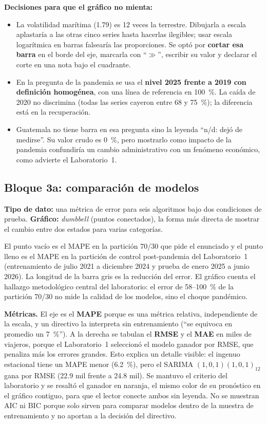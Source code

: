 \documentclass[12pt,letterpaper]{article}
\begin{document}
\textbf{Decisiones para que el gráfico no mienta:}
\begin{itemize}[leftmargin=1.4em,itemsep=2pt]
  \item La volatilidad marítima (1.79) es 12 veces la terrestre. Dibujarla a escala aplastaría a
  las otras cinco series hasta hacerlas ilegibles; usar escala logarítmica en barras
  falsearía las proporciones. Se optó por \textbf{cortar esa barra} en el borde del eje,
  marcarla con ``$\gg$'', escribir su valor y declarar el corte en una nota bajo el cuadrante.
  \item En la pregunta de la pandemia se usa el \textbf{nivel 2025 frente a 2019 con definición
  homogénea}, con una línea de referencia en 100~\%. La caída de 2020 no discrimina (todas las
  series cayeron entre 68 y 75~\%); la diferencia está en la recuperación.
  \item Guatemala no tiene barra en esa pregunta sino la leyenda ``n/d: dejó de medirse''. Su
  valor crudo es 0~\%, pero mostrarlo como impacto de la pandemia confundiría un cambio
  administrativo con un fenómeno económico, como advierte el Laboratorio~1.
\end{itemize}

\subsection{Bloque 3a: comparación de modelos}

\textbf{Tipo de dato:} una métrica de error para seis algoritmos bajo dos condiciones de prueba.
\textbf{Gráfico:} \textit{dumbbell} (puntos conectados), la forma más directa de mostrar el
cambio entre dos estados para varias categorías.

El punto vacío es el MAPE en la partición 70/30 que pide el enunciado y el punto lleno es el MAPE
en la partición de control post-pandemia del Laboratorio~1 (entrenamiento de julio 2021 a
diciembre 2024 y prueba de enero 2025 a junio 2026). La longitud de la barra gris es la
reducción del error. El gráfico cuenta el hallazgo metodológico central del laboratorio: el error
de 58--100~\% de la partición 70/30 no mide la calidad de los modelos, sino el choque pandémico.

\textbf{Métricas.} El eje es el \textbf{MAPE} porque es una métrica relativa, independiente de la
escala, y un directivo la interpreta sin entrenamiento (``se equivoca en promedio un 7~\%''). A la
derecha se tabulan el \textbf{RMSE} y el \textbf{MAE} en miles de viajeros, porque el
Laboratorio~1 seleccionó el modelo ganador por RMSE, que penaliza más los errores grandes. Esto
explica un detalle visible: el ingenuo estacional tiene un MAPE menor (6.2~\%), pero el SARIMA
$(1,0,1)(1,0,1)_{12}$ gana por RMSE (22.9 mil frente a 24.8 mil). Se mantuvo el criterio del
laboratorio y se resaltó el ganador en naranja, el mismo color de su pronóstico en el gráfico
contiguo, para que el lector conecte ambos sin leyenda. No se muestran AIC ni BIC porque solo
sirven para comparar modelos dentro de la muestra de entrenamiento y no aportan a la decisión del
directivo.
\end{document}
